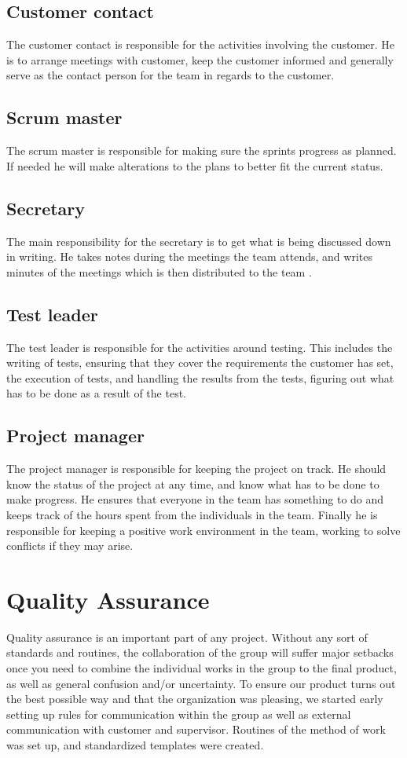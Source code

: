\documentclass[11pt]{book}
\begin{document}
\subsection{Customer contact}
The customer contact is responsible for the activities involving the customer. He is to arrange meetings with customer, keep the customer informed and generally serve as the contact person for the team in regards to the customer.

\subsection{Scrum master}
The scrum master is responsible for making sure the sprints progress as planned. If needed he will make alterations to the plans to better fit the current status.

\subsection{Secretary}
The main responsibility for the secretary is to get what is being discussed down in writing. He takes notes during the meetings the team attends, and writes minutes of the meetings which is then distributed to the team .

\subsection{Test leader}
The test leader is responsible for the activities around testing. This includes the writing of tests, ensuring that they cover the requirements the customer has set, the execution of tests, and handling the results from the tests, figuring out what has to be done as a result of the test.

\subsection{Project manager}
The project manager is responsible for keeping the project on track. He should know the status of the project at any time, and know what has to be done to make progress. He ensures that everyone in the team has something to do and keeps track of the hours spent from the individuals in the team. Finally he is responsible for keeping a positive work environment in the team, working to solve conflicts if they may arise.

\section{Quality Assurance}
Quality assurance is an important part of any project. Without any sort of standards and routines, the collaboration of the group will suffer major setbacks once you need to combine the individual works in the group to the final product, as well as general confusion and/or uncertainty. To ensure our product turns out the best possible way and that the organization was pleasing, we started early setting up rules for communication within the group as well as external communication with customer and supervisor. Routines of the method of work was set up, and standardized templates were created.
\end{document}
